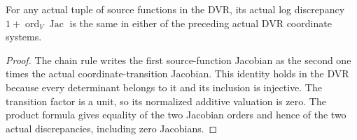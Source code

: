 \begin{theorem}\label{thm:sc0-dvr-log-discrepancy-coordinate-independent}
\leanok
{}
For any actual tuple of source functions in the DVR, its actual log
discrepancy $1+\operatorname{ord}_V\operatorname{Jac}$ is the same in either
of the preceding actual DVR coordinate systems.
\end{theorem}
\begin{proof}
The chain rule writes the first source-function Jacobian as the second one
times the actual coordinate-transition Jacobian. This identity holds in the
DVR because every determinant belongs to it and its inclusion is injective.
The transition factor is a unit, so its normalized additive valuation is
zero. The product formula gives equality of the two Jacobian orders and
hence of the two actual discrepancies, including zero Jacobians.
\end{proof}
